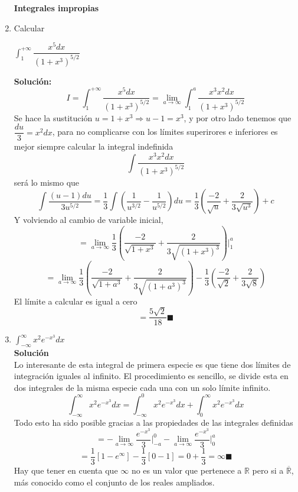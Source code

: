 \documentclass[10pt,twoside]{SelfArx} %
\begin{document}
\begin{enumerate}
\textbf{Integrales impropias}\\
\item Calcular 

$ \displaystyle\int_{1}^{+\infty}\dfrac{x^{5}dx}{(1+x^{3})^{5/2}} $

\textbf{Solución:}\\
\begin{equation}
I=\int_{1}^{+\infty}\dfrac{x^{5}dx}{(1+x^{3})^{5/2}}=\lim\limits_{a\rightarrow\infty}\int_{1}^{a}\dfrac{x^{3}x^{2}dx}{(1+x^{3})^{5/2}}
\end{equation}
Se hace la sustitución $ u=1+x^{3}\Rightarrow u-1=x^{3} $, y por otro lado tenemos que $ \dfrac{du}{3}=x^{2}dx $, para no complicarse con los límites superirores e inferiores es mejor siempre calcular la integral indefinida
\[ \int\dfrac{x^{3}x^{2}dx}{(1+x^{3})^{5/2}} \]
será lo mismo que 
\[ \int \dfrac{(u-1)du}{3u^{5/2}}=\dfrac{1}{3}\int\left (\dfrac{1}{u^{3/2}}-\dfrac{1}{u^{5/2}}\right )du=\dfrac{1}{3}\left (\dfrac{-2}{\sqrt{u}}+\dfrac{2}{3\sqrt{u^{3}}}\right )+c \]
Y volviendo al cambio de variable inicial, 
\begin{equation}
=\lim\limits_{a\rightarrow\infty}\dfrac{1}{3}\left (\dfrac{-2}{\sqrt{1+x^{3}}}+\dfrac{2}{3\sqrt{(1+x^{3})^{3}}}\right )\bigg|_{1}^{a}
\end{equation}
\begin{equation}
=\lim\limits_{a\rightarrow\infty}\dfrac{1}{3}\left (\dfrac{-2}{\sqrt{1+a^{3}}}+\dfrac{2}{3\sqrt{(1+a^{3})^{3}}}\right )
-\dfrac{1}{3}\left (\dfrac{-2}{\sqrt{2}}+\dfrac{2}{3\sqrt{8}}\right )
\end{equation}
El límite a calcular es igual a cero
\begin{equation}
=\dfrac{5\sqrt{2}}{18}\blacksquare
\end{equation}
\item $ \displaystyle\int_{-\infty}^{\infty}x^{2}e^{-x^{3}}dx $\\
\textbf{Soluci\'on}\\
Lo interesante de esta integral de primera especie es que tiene dos límites de integración iguales al infinito. El procedimiento es sencillo, se divide esta en dos integrales de la misma especie cada una con un solo l\'imite infinito.
\begin{equation}
\displaystyle\int_{-\infty}^{\infty}x^{2}e^{-x^{3}}dx=\displaystyle\int_{-\infty}^{0}x^{2}e^{-x^{3}}dx+\displaystyle\int_{0}^{\infty}x^{2}e^{-x^{3}}dx
\end{equation}
Todo esto ha sido posible gracias a las propiedades de las integrales definidas
\begin{equation}
=-\lim\limits_{a\rightarrow\infty}\dfrac{e^{-x^{3}}}{3}\bigg|_{-a}^{0}-\lim\limits_{a\rightarrow\infty}\dfrac{e^{-x^{3}}}{3}\bigg|_{0}^{a}
\end{equation}
\begin{equation}
=\dfrac{1}{3}[1-e^{\infty}]-\dfrac{1}{3}[0-1]=0+\dfrac{1}{3}=\infty\blacksquare
\end{equation}
Hay que tener en cuenta que $ \infty $ no es un valor que pertenece a $ \mathbb{R} $ pero si a $ \overline{\mathbb{R}} $, m\'as conocido como el conjunto de los reales ampliados.


\end{enumerate}
\end{document}
